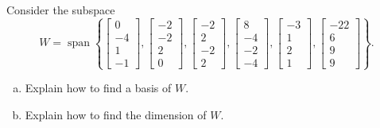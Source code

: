 
\begin{exerciseStatement}


Consider the subspace \[W=\operatorname{span}  \left\{ \left[\begin{array}{c}
0 \\
-4 \\
1 \\
-1
\end{array}\right] , \left[\begin{array}{c}
-2 \\
-2 \\
2 \\
0
\end{array}\right] , \left[\begin{array}{c}
-2 \\
2 \\
-2 \\
2
\end{array}\right] , \left[\begin{array}{c}
8 \\
-4 \\
-2 \\
-4
\end{array}\right] , \left[\begin{array}{c}
-3 \\
1 \\
2 \\
1
\end{array}\right] , \left[\begin{array}{c}
-22 \\
6 \\
9 \\
9
\end{array}\right] \right\} .\]


\begin{enumerate}[(a)]
\item  Explain how to find a basis of \(W\).
\item  Explain how to find the dimension of \(W\).
\end{enumerate}
    
\end{exerciseStatement}
    
